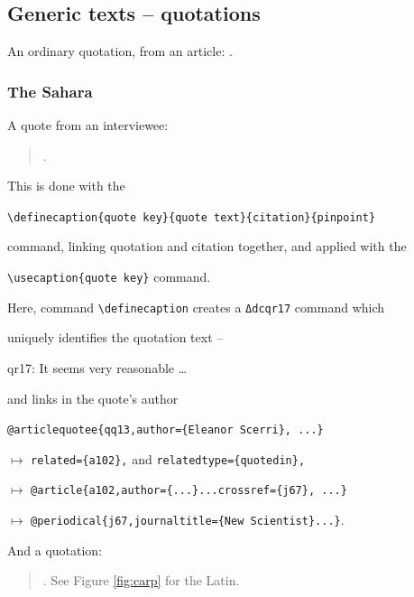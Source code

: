 \documentclass{article}
\begin{document}
\subsection{Generic texts -- quotations}
An ordinary quotation, from an article: .
\subsubsection{The Sahara}
A quote from an interviewee:
\begin{quotation}
.
\end{quotation}

This is done with the

\verb|\definecaption{quote key}{quote text}{citation}{pinpoint}|


command, linking quotation and citation together, and applied with the

\verb|\usecaption{quote key}| command.

Here, command \verb|\definecaption| creates a \verb|Δdcqr17| command which 

uniquely identifies the quotation text -- 

qr17: It seems very reasonable \ldots

and links in the quote's author 

\verb|@articlequotee{qq13,author={Eleanor Scerri}, ...}|

$\mapsto$ \verb|related={a102},| and \verb|relatedtype={quotedin},|

$\mapsto$ \verb|@article{a102,author={...}...crossref={j67}, ...}|

$\mapsto$ \verb|@periodical{j67,journaltitle={New Scientist}...}|.


And a quotation:

\begin{quotation}
. See Figure \ref{fig:carp} for the Latin.
\end{quotation}

\end{document}
